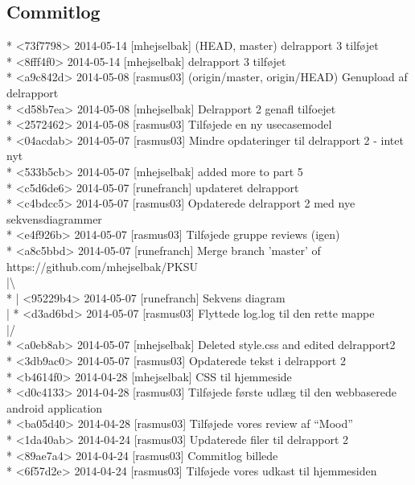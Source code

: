\documentclass[12pt]{article}
\begin{document}
\subsection{Commitlog}
* <73f7798> 2014-05-14 [mhejselbak]  (HEAD, master) delrapport 3 tilføjet \\
* <8fff4f0> 2014-05-14 [mhejselbak]  delrapport 3 tilføjet \\
* <a9c842d> 2014-05-08 [rasmus03]  (origin/master, origin/HEAD) Genupload af delrapport \\
* <d58b7ea> 2014-05-08 [mhejselbak]  Delrapport 2 genafl tilfoejet \\
* <2572462> 2014-05-08 [rasmus03]  Tilføjede en ny usecasemodel \\
* <04acdab> 2014-05-07 [rasmus03]  Mindre opdateringer til delrapport 2 - intet nyt \\
* <533b5cb> 2014-05-07 [mhejselbak]  added more to part 5 \\
* <c5d6de6> 2014-05-07 [runefranch]  updateret delrapport \\
* <c4bdcc5> 2014-05-07 [rasmus03]  Opdaterede delrapport 2 med nye sekvensdiagrammer \\
* <e4f926b> 2014-05-07 [rasmus03]  Tilføjede gruppe reviews (igen) \\
*   <a8c5bbd> 2014-05-07 [runefranch]  Merge branch 'master' of https://github.com/mhejselbak/PKSU \\
|\textbackslash   \\
* | <95229b4> 2014-05-07 [runefranch]  Sekvens diagram \\
| * <d3ad6bd> 2014-05-07 [rasmus03]  Flyttede log.log til den rette mappe\\
|/  \\
* <a0eb8ab> 2014-05-07 [mhejselbak]  Deleted style.css and edited delrapport2 \\
* <3db9ac0> 2014-05-07 [rasmus03]  Opdaterede tekst i delrapport 2 \\
* <b4614f0> 2014-04-28 [mhejselbak]  CSS til hjemmeside \\
* <d0c4133> 2014-04-28 [rasmus03]  Tilføjede første udlæg til den webbaserede android application \\
* <ba05d40> 2014-04-28 [rasmus03]  Tilføjede vores review af “Mood” \\
* <1da40ab> 2014-04-24 [rasmus03]  Updaterede filer til delrapport 2 \\
* <89ae7a4> 2014-04-24 [rasmus03]  Commitlog billede \\
* <6f57d2e> 2014-04-24 [rasmus03]  Tilføjede vores udkast til hjemmesiden \\
\end{document}
